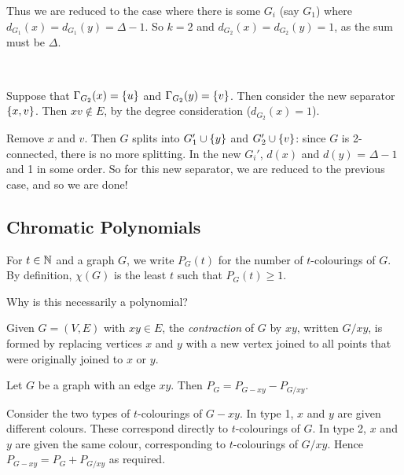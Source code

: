 \documentclass{article}
\begin{document}
\begin{prf}
    Thus we are reduced to the case where there is some $G_i$ (say $G_1$) where $d_{G_1}(x) = d_{G_1}(y) = \Delta - 1$. So $k = 2$ and $d_{G_2}(x) = d_{G_2}(y) = 1$, as the sum must be $\Delta$.
    
    \  \
    
    Suppose that $\Gamma_{G_2}(x) = \left\lbrace u \right\rbrace$ and $\Gamma_{G_2}(y) = \left\lbrace v \right\rbrace$. Then consider the new separator $\left\lbrace x, v \right\rbrace$. Then $xv \notin E$, by the degree consideration ($d_{G_2}(x) = 1$).
    
    Remove $x$ and $v$. Then $G$ splits into $G_1' \cup \left\lbrace y \right\rbrace$ and $G_2' \cup \left\lbrace v \right\rbrace$: since $G$ is 2-connected, there is no more splitting. In the new $G_i'$, $d(x)$ and $d(y)$ = $\Delta - 1$ and 1 in some order. So for this new separator, we are reduced to the previous case, and so we are done!
\end{prf}


\subsection{Chromatic Polynomials}

\begin{definition}
    For $t \in \mathbb{N}$ and a graph $G$, we write $P_G(t)$ for the number of $t$-colourings of $G$. By definition, $\chi(G)$ is the least $t$ such that $P_G(t) \geq 1$.
\end{definition}

Why is this necessarily a polynomial?

\begin{definition}[Contraction]
     Given $G = (V, E)$ with $xy \in E$, the \textit{contraction} of $G$ by $xy$, written $G/xy$, is formed by replacing vertices $x$ and $y$ with a new vertex joined to all points that were originally joined to $x$ or $y$.
\end{definition}

\begin{proposition}
    \label{deletion-contraction-relation}
    Let $G$ be a graph with an edge $xy$. Then $P_G = P_{G-xy} - P_{G/xy}$.
\end{proposition}

\begin{prf}
    Consider the two types of $t$-colourings of $G-xy$. In type 1, $x$ and $y$ are given different colours. These correspond directly to $t$-colourings of $G$. In type 2, $x$ and $y$ are given the same colour, corresponding to $t$-colourings of $G/xy$. Hence $P_{G-xy} = P_G + P_{G/xy}$ as required.
\end{prf}
\end{document}
